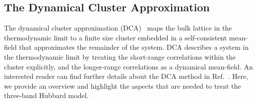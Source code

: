 \documentclass[reprint,nofootinbib,nobibnotes,amsmath,amssymb,aps,prb,floatfix]{revtex4-2}
\begin{document}
\vskip 0.5cm 
\noindent
\subsection{ The Dynamical Cluster Approximation}\label{sec:MethodsDCA}
The dynamical cluster approximation (DCA)~\cite{Maier1, Maier2, Maier3} maps the bulk lattice in the thermodynamic limit to a finite size cluster embedded in a self-consistent mean-field that approximates the remainder of the system. DCA describes a system in the thermodynamic limit by treating the short-range correlations within the cluster explicitly, and the longer-range correlations as a dynamical mean-field. An interested reader can find further details about the DCA method in Ref.~\cite{Maier1}. Here, we provide an overview and highlight the aspects that are needed to treat the three-band Hubbard model.
\end{document}

